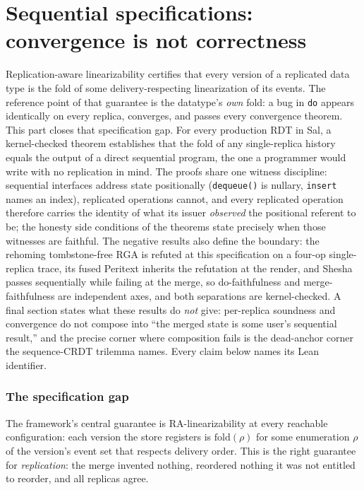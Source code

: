 \documentclass[11pt]{article}
\let\salInlinePart\part
\renewcommand{\part}{\clearpage\salInlinePart}
\newcommand{\code}[1]{\texttt{#1}}
\begin{document}
\part{Sequential specifications: convergence is not correctness}

\noindent
Replication-aware linearizability certifies that every version of a
replicated data type is the fold of some delivery-respecting
linearization of its events. The reference point of that guarantee is
the datatype's \emph{own} fold: a bug in \code{do} appears identically
on every replica, converges, and passes every convergence theorem. This
part closes that specification gap. For every production RDT in Sal, a
kernel-checked theorem establishes that the
fold of any single-replica history equals the output of a
direct sequential program, the one a programmer would write
with no replication in mind. The proofs share one witness discipline:
sequential interfaces address state
positionally (\code{dequeue()} is nullary, \code{insert} names an
index), replicated operations cannot, and every replicated operation
therefore carries the identity of what its issuer \emph{observed} the
positional referent to be; the honesty side conditions of the theorems
state precisely when those witnesses are faithful. The negative results
also define the boundary: the
rehoming tombstone-free RGA is refuted at this specification on a
four-op single-replica trace, its fused Peritext inherits the
refutation at the render, and Shesha passes sequentially while failing
at the merge, so do-faithfulness and merge-faithfulness are
independent axes, and both separations are kernel-checked. A final
section states what these results do \emph{not} give: per-replica
soundness and convergence do not compose into ``the merged state is
some user's sequential result,'' and the precise corner where
composition fails is the dead-anchor corner the sequence-CRDT
trilemma names. Every claim below names its Lean identifier.

\section{The specification gap}
\label{sec:gap}

The framework's central guarantee is RA-linearizability at every
reachable configuration: each version the store registers is
$\mathrm{fold}(\rho)$ for some enumeration $\rho$ of the version's
event set that respects delivery order. This is the right guarantee
for \emph{replication}: the merge invented nothing, reordered nothing
it was not entitled to reorder, and all replicas agree.
\end{document}
